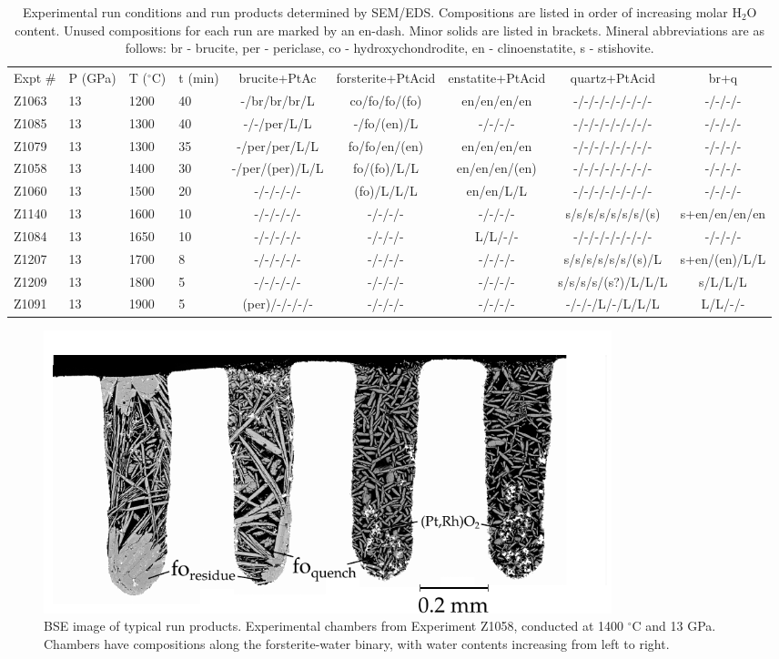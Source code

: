 \documentclass[review]{elsarticle}
\begin{document}
\begin{landscape}
\begin{table}[ht!]
\caption{Experimental run conditions and run products determined by SEM/EDS. Compositions are listed in order of increasing molar H$_2$O content. Unused compositions for each run are marked by an en-dash. Minor solids are listed in brackets. Mineral abbreviations are as follows: br - brucite, per - periclase, co - hydroxychondrodite, en - clinoenstatite, s - stishovite.}
\label{table:experiments}
\begin{tabular}{llllccccc}
Expt \# & P (GPa) & T ($^{\circ}$C) & t (min) & brucite+PtAc & forsterite+PtAcid & enstatite+PtAcid & quartz+PtAcid & br+q \\
Z1063 & 13 & 1200 & 40 & -/br/br/br/L & co/fo/fo/(fo) & en/en/en/en & -/-/-/-/-/-/-/- & -/-/-/- \\
Z1085 & 13 & 1300 & 40 & -/-/per/L/L & -/fo/(en)/L & -/-/-/- & -/-/-/-/-/-/-/- & -/-/-/- \\
Z1079 & 13 & 1300 & 35 & -/per/per/L/L & fo/fo/en/(en) & en/en/en/en & -/-/-/-/-/-/-/- & -/-/-/- \\
Z1058 & 13 & 1400 & 30 & -/per/(per)/L/L & fo/(fo)/L/L & en/en/en/(en) & -/-/-/-/-/-/-/- & -/-/-/- \\
Z1060 & 13 & 1500 & 20 & -/-/-/-/- & (fo)/L/L/L & en/en/L/L & -/-/-/-/-/-/-/- & -/-/-/- \\
Z1140 & 13 & 1600 & 10 & -/-/-/-/- & -/-/-/- & -/-/-/- & s/s/s/s/s/s/s/(s) & s+en/en/en/en \\
Z1084 & 13 & 1650 & 10 & -/-/-/-/- & -/-/-/- & L/L/-/- & -/-/-/-/-/-/-/- & -/-/-/- \\
Z1207 & 13 & 1700 & 8 & -/-/-/-/- & -/-/-/- & -/-/-/- & s/s/s/s/s/s/(s)/L & s+en/(en)/L/L \\
Z1209 & 13 & 1800 & 5 & -/-/-/-/- & -/-/-/- & -/-/-/- & s/s/s/s/(s?)/L/L/L & s/L/L/L \\
Z1091 & 13 & 1900 & 5 & (per)/-/-/-/- & -/-/-/- & -/-/-/- & -/-/-/L/-/L/L/L & L/L/-/-
\end{tabular}
\end{table}
\end{landscape}


\begin{figure}[ht!]
  \centering
      \includegraphics[width=0.8\textwidth]{figures/Z1058_1400C_13GPa_fo}
  \caption{BSE image of typical run products. Experimental chambers from Experiment Z1058, conducted at 1400 $^{\circ}$C and 13 GPa. Chambers have compositions along the forsterite-water binary, with water contents increasing from left to right.}
  \label{fig:sem}
\end{figure}
\end{document}
